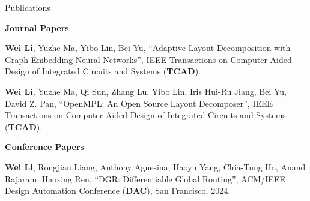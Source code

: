 \newpage
\begin{rSection}{Publications}


    \textbf{Journal Papers}
    \begin{description}[font=\normalfont]
        \item[{[J2]}]{
            \textbf{Wei Li}, Yuzhe Ma, Yibo Lin, Bei Yu, 
            ``Adaptive Layout Decomposition with Graph Embedding Neural Networks'', IEEE Transactions on Computer-Aided Design of Integrated Circuits and Systems (\textbf{TCAD}).
        }
        \item[{[J1]}]{
            \textbf{Wei Li}, Yuzhe Ma, Qi Sun, Zhang Lu, Yibo Lin, Iris Hui-Ru Jiang, Bei Yu, David Z. Pan,
            ``OpenMPL: An Open Source Layout Decomposer'', IEEE Transactions on Computer-Aided Design of Integrated Circuits and Systems (\textbf{TCAD}).
        }
    \end{description}
\textbf{Conference Papers}
\begin{description}[font=\normalfont]
    \item[{[C13]}]{
        \textbf{Wei Li}, Rongjian Liang, Anthony Agnesina, Haoyu Yang, Chia-Tung Ho, Anand Rajaram, Haoxing Ren, 
        ``DGR: Differentiable Global Routing'', ACM/IEEE Design Automation Conference (\textbf{DAC}), San Francisco, 2024. 
    }


\end{description}
\end{rSection}
